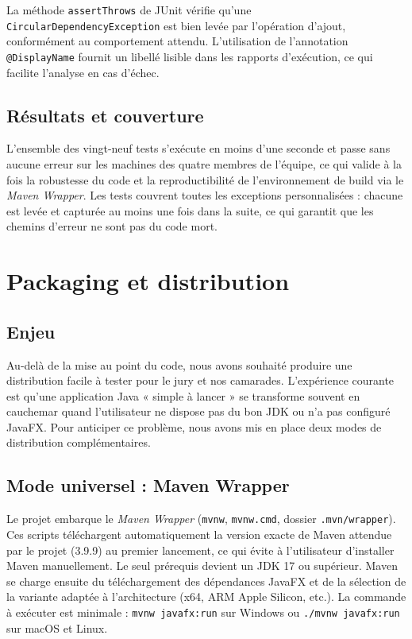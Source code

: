 \documentclass[11pt]{article}
\begin{document}
La méthode \texttt{assertThrows} de JUnit vérifie qu'une
\texttt{CircularDependencyException} est bien levée par l'opération
d'ajout, conformément au comportement attendu. L'utilisation de
l'annotation \texttt{@DisplayName} fournit un libellé lisible dans les
rapports d'exécution, ce qui facilite l'analyse en cas d'échec.

\subsection{Résultats et couverture}
L'ensemble des vingt-neuf tests s'exécute en moins d'une seconde et
passe sans aucune erreur sur les machines des quatre membres de
l'équipe, ce qui valide à la fois la robustesse du code et la
reproductibilité de l'environnement de build via le \textit{Maven Wrapper}.
Les tests couvrent toutes les exceptions personnalisées : chacune est
levée et capturée au moins une fois dans la suite, ce qui garantit que
les chemins d'erreur ne sont pas du code mort.

\section{Packaging et distribution}

\subsection{Enjeu}
Au-delà de la mise au point du code, nous avons souhaité produire une
distribution facile à tester pour le jury et nos camarades. L'expérience
courante est qu'une application Java « simple à lancer » se transforme
souvent en cauchemar quand l'utilisateur ne dispose pas du bon JDK ou
n'a pas configuré JavaFX. Pour anticiper ce problème, nous avons mis en
place deux modes de distribution complémentaires.

\subsection{Mode universel : Maven Wrapper}
Le projet embarque le \textit{Maven Wrapper} (\texttt{mvnw},
\texttt{mvnw.cmd}, dossier \texttt{.mvn/wrapper}). Ces scripts
téléchargent automatiquement la version exacte de Maven attendue par le
projet (3.9.9) au premier lancement, ce qui évite à l'utilisateur
d'installer Maven manuellement. Le seul prérequis devient un JDK 17 ou
supérieur. Maven se charge ensuite du téléchargement des dépendances
JavaFX et de la sélection de la variante adaptée à l'architecture (x64,
ARM Apple Silicon, etc.). La commande à exécuter est minimale :
\texttt{mvnw javafx:run} sur Windows ou \texttt{./mvnw javafx:run} sur
macOS et Linux.
\end{document}
